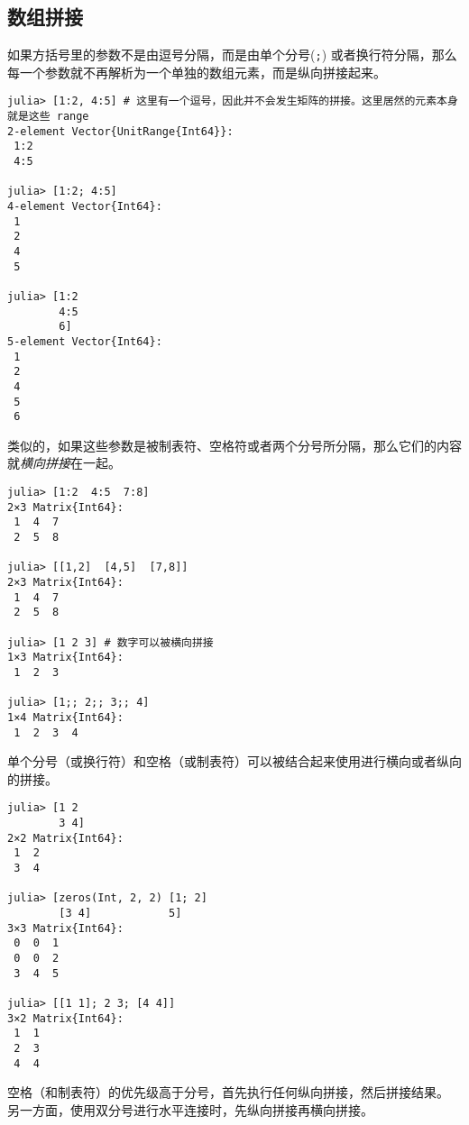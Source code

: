 \hypertarget{8665822927896221545}{}


\subsection{数组拼接}



如果方括号里的参数不是由逗号分隔，而是由单个分号(\texttt{;}) 或者换行符分隔，那么每一个参数就不再解析为一个单独的数组元素，而是纵向拼接起来。  




\begin{verbatim}
julia> [1:2, 4:5] # 这里有一个逗号，因此并不会发生矩阵的拼接。这里居然的元素本身就是这些 range
2-element Vector{UnitRange{Int64}}:
 1:2
 4:5

julia> [1:2; 4:5]
4-element Vector{Int64}:
 1
 2
 4
 5

julia> [1:2
        4:5
        6]
5-element Vector{Int64}:
 1
 2
 4
 5
 6
\end{verbatim}



类似的，如果这些参数是被制表符、空格符或者两个分号所分隔，那么它们的内容就\emph{横向拼接}在一起。




\begin{verbatim}
julia> [1:2  4:5  7:8]
2×3 Matrix{Int64}:
 1  4  7
 2  5  8

julia> [[1,2]  [4,5]  [7,8]]
2×3 Matrix{Int64}:
 1  4  7
 2  5  8

julia> [1 2 3] # 数字可以被横向拼接
1×3 Matrix{Int64}:
 1  2  3

julia> [1;; 2;; 3;; 4]
1×4 Matrix{Int64}:
 1  2  3  4
\end{verbatim}



单个分号（或换行符）和空格（或制表符）可以被结合起来使用进行横向或者纵向的拼接。




\begin{verbatim}
julia> [1 2
        3 4]
2×2 Matrix{Int64}:
 1  2
 3  4

julia> [zeros(Int, 2, 2) [1; 2]
        [3 4]            5]
3×3 Matrix{Int64}:
 0  0  1
 0  0  2
 3  4  5

julia> [[1 1]; 2 3; [4 4]]
3×2 Matrix{Int64}:
 1  1
 2  3
 4  4
\end{verbatim}



空格（和制表符）的优先级高于分号，首先执行任何纵向拼接，然后拼接结果。 另一方面，使用双分号进行水平连接时，先纵向拼接再横向拼接。




